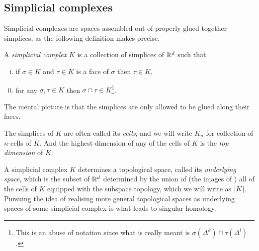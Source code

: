 \documentclass[../main.tex]{subfiles}
\begin{document}
\subsection{Simplicial complexes}
Simplicial complexes are spaces assembled out of properly glued together simplices, as the
following definition makes precise. 
\begin{definition}\label{def:simplicial complex}
	A \emph{simplicial complex} \( K \) is a collection of simplices of \( \mathbb{R}^d \) such that 
	\begin{enumerate}[(i)]
		\item if \( \sigma \in K \) and \( \tau \in K \) is a face of \( \sigma \) then \(
			\tau \in K \),
		\item for any \( \sigma, \tau \in K \) then \( \sigma \cap \tau \in K \)\footnote{This
			is an abuse of notation since what is really meant is \( \sigma(\Delta^k) \cap
		\tau(\Delta^l) \).}. 
	\end{enumerate}
\end{definition}
The mental picture is that the simplices are only allowed to be glued along their faces. 

The simplices of \( K \) are often called its \emph{cells}, and we will write \( K_n \)
for collection of \( n \)-cells of \( K \). And the highest dimension of any of the cells
of \( K \) is the \emph{top dimension} of \( K \). 

A simplicial complex \( K \) determines a topological space, called its \emph{underlying
space}, which is the subset of \( \mathbb{R}^d \) determined by the union of (the images of ) all
of the cells of \( K \) equipped with the subspace topology, which we will write as \(
\left\lvert K \right\rvert \). Pursuing the idea of realising more general topological spaces as underlying
spaces of some simplicial complex is what leads to singular homology. 
\end{document}
